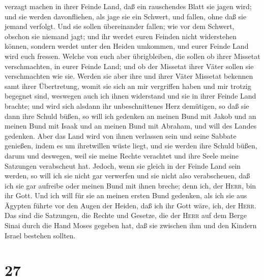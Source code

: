 verzagt machen in ihrer Feinde Land, daß ein rauschendes Blatt sie jagen
wird; und sie werden davonfliehen, als jage sie ein Schwert, und fallen,
ohne daß sie jemand verfolgt.  Und sie sollen
übereinander fallen; wie vor dem Schwert, obschon sie niemand jagt; und
ihr werdet euren Feinden nicht widerstehen können, 
sondern werdet unter den Heiden umkommen, und eurer Feinde Land wird
euch fressen.  Welche von euch aber übrigbleiben, die
sollen ob ihrer Missetat verschmachten, in eurer Feinde Land; und ob der
Missetat ihrer Väter sollen sie verschmachten wie sie. 
Werden sie aber ihre und ihrer Väter Missetat bekennen samt ihrer
Übertretung, womit sie sich an mir vergriffen haben und mir trotzig
begegnet sind,  weswegen auch ich ihnen widerstand und
sie in ihrer Feinde Land brachte; und wird sich alsdann ihr
unbeschnittenes Herz demütigen, so daß sie dann ihre Schuld büßen,
 so will ich gedenken an meinen Bund mit Jakob und an
meinen Bund mit Isaak und an meinen Bund mit Abraham, und will des
Landes gedenken.  Aber das Land wird von ihnen verlassen
sein und seine Sabbate genießen, indem es um ihretwillen wüste liegt,
und sie werden ihre Schuld büßen, darum und deswegen, weil sie meine
Rechte verachtet und ihre Seele meine Satzungen verabscheut hat.
 Jedoch, wenn sie gleich in der Feinde Land sein werden,
so will ich sie nicht gar verwerfen und sie nicht also verabscheuen, daß
ich sie gar aufreibe oder meinen Bund mit ihnen breche; denn ich, der
\textsc{Herr}, bin ihr Gott.  Und ich will für sie an
meinen ersten Bund gedenken, als ich sie aus Ägypten führte vor den
Augen der Heiden, daß ich ihr Gott wäre, ich, der \textsc{Herr}.
 Das sind die Satzungen, die Rechte und Gesetze, die der
\textsc{Herr} auf dem Berge Sinai durch die Hand Moses gegeben hat, daß
sie zwischen ihm und den Kindern Israel bestehen sollten.

\hypertarget{section-26}{%
\section{27}\label{section-26}}

